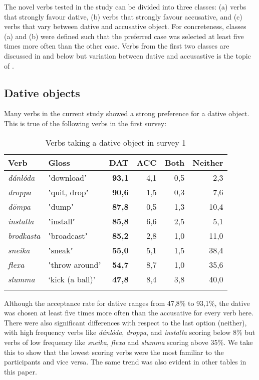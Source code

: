 \documentclass[output=paper,modfonts,nonflat,colorlinks,citecolor=brown]{langsci/langscibook}
\begin{document}
The novel verbs tested in the study can be divided into three classes: (a) verbs that strongly favour dative, (b) verbs that strongly favour accusative, and (c) verbs that vary between dative and accusative object. For concreteness, classes (a) and (b) were defined such that the preferred case was selected at least five times more often than the other case. Verbs from the first two classes are discussed in  and  below but variation between dative and accusastive is the topic of .

\subsection{Dative objects} %
\label{sec:jonsson:3.2}

Many verbs in the current study showed a strong preference for a dative object. This is true of the following verbs in the first survey:

\begin{table}
\caption{\label{tab:jonsson:1}Verbs taking a dative object in survey 1}
\begin{tabularx}{\textwidth}{XXrrrr}
\lsptoprule
Verb & Gloss & \textbf{DAT} & ACC & Both & Neither\\
\midrule
\textit{dánlóda} & ʽdownloadʼ & \textbf{93,1} & 4,1 & 0,5 & 2,3\\
\textit{droppa} & ʽquit, dropʼ & \textbf{90,6} & 1,5 & 0,3 & 7,6\\
\textit{dömpa} & ʽdumpʼ & \textbf{87,8} & 0,5 & 1,3 & 10,4\\
\textit{installa} & ʽinstallʼ & \textbf{85,8} & 6,6 & 2,5 & 5,1\\
\textit{brodkasta} & ʽbroadcastʼ & \textbf{85,2} & 2,8 & 1,0 & 11,0\\
\textit{sneika} & ʽsneakʼ & \textbf{55,0} & 5,1 & 1,5 & 38,4\\
\textit{flexa} & ʽthrow aroundʼ & \textbf{54,7} & 8,7 & 1,0 & 35,6\\
\textit{slumma} & ‘kick (a ball)’ & \textbf{47,8} & 8,4 & 3,8 & 40,0\\
\lspbottomrule
\end{tabularx}
\end{table}

Although the acceptance rate for dative ranges from 47,8\% to 93,1\%, the dative was chosen at least five times more often than the accusative for every verb here. There were also significant differences with respect to the last option (neither), with high frequency verbs like \textit{dánlóda}, \textit{droppa}, and \textit{installa} scoring below 8\% but verbs of low frequency like \textit{sneika}, \textit{flexa} and \textit{slumma} scoring above 35\%. We take this to show that the lowest scoring verbs were the most familiar to the participants and vice versa. The same trend was also evident in other tables in this paper.
\end{document}
